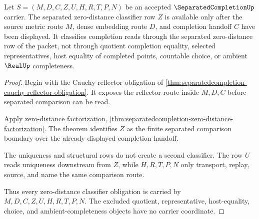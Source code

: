 \begin{theorem}
\label{thm:separatedcompletion-zero-distance-classifier-obligation}
Let $S=(M,D,C,Z,U,H,R,T,P,N)$ be an accepted $\SeparatedCompletionUp$ carrier. The separated zero-distance classifier row $Z$ is available only after the source metric route $M$, dense embedding route $D$, and completion handoff $C$ have been displayed. It classifies completion reads through the separated zero-distance row of the packet, not through quotient completion equality, selected representatives, host equality of completed points, countable choice, or ambient $\RealUp$ completeness.
\end{theorem}
\begin{proof}
Begin with the Cauchy reflector obligation of \autoref{thm:separatedcompletion-cauchy-reflector-obligation}. It exposes the reflector route inside $M,D,C$ before separated comparison can be read.

Apply zero-distance factorization, \autoref{thm:separatedcompletion-zero-distance-factorization}. The theorem identifies $Z$ as the finite separated comparison boundary over the already displayed completion handoff.

The uniqueness and structural rows do not create a second classifier. The row $U$ reads uniqueness downstream from $Z$, while $H,R,T,P,N$ only transport, replay, source, and name the same comparison route.

Thus every zero-distance classifier obligation is carried by $M,D,C,Z,U,H,R,T,P,N$. The excluded quotient, representative, host-equality, choice, and ambient-completeness objects have no carrier coordinate.
\end{proof}

